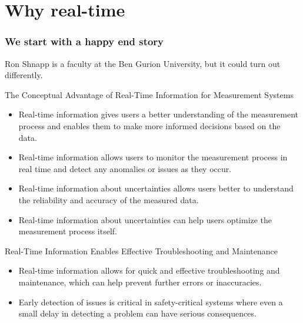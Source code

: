 \section{Why real-time}


\begin{frame}[label=intro]
\frametitle{We start with a happy end story}
\begin{cardTiny}
Ron Shnapp is a faculty at the Ben Gurion University, but it could turn out differently. 
\end{cardTiny}
\end{frame}

\begin{frame}{The Conceptual Advantage of Real-Time Information for Measurement Systems}

\begin{itemize}
\item Real-time information gives users a better understanding of the measurement process and enables them to make more informed decisions based on the data.
\item Real-time information allows users to monitor the measurement process in real time and detect any anomalies or issues as they occur.
\item Real-time information about uncertainties allows users better to understand the reliability and accuracy of the measured data.
\item Real-time information about uncertainties can help users optimize the measurement process itself.
\end{itemize}

\end{frame}

\begin{frame}{Real-Time Information Enables Effective Troubleshooting and Maintenance}

\begin{itemize}
\item Real-time information allows for quick and effective troubleshooting and maintenance, which can help prevent further errors or inaccuracies.
\item Early detection of issues is critical in safety-critical systems where even a small delay in detecting a problem can have serious consequences.
\end{itemize}

\end{frame}

